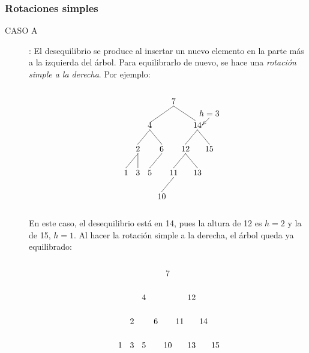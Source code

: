 \documentclass[10pt,a4paper,spanish]{report}
\begin{document}
\subsubsection{\textcolor[rgb]{0.3,0.4,0.8}Rotaciones simples}
\begin{description}
    \item[CASO A]: El desequilibrio se produce al insertar un nuevo elemento  en la parte más a la izquierda del árbol. Para equilibrarlo de nuevo, se hace una \textit{\textcolor[rgb]{0.3,0.4,0.8}{rotación simple a la derecha}}. Por ejemplo:

    \[\begin{xy}
	,(0,0)*+=<10mm>[]\txt<2cm>{7}
	,(15,-5)*+=<10mm>[]\txt<2cm>{$h=3$}
	,(-10,-10)*+=<10mm>[]\txt<2cm>{4}
	,(10,-10)*+=<10mm>[]\txt<2cm>{14}
	,(-15,-20)*+=<10mm>[]\txt<2cm>{2}
	,(-5,-20)*+=<10mm>[]\txt<2cm>{6}
	,(5,-20)*+=<10mm>[]\txt<2cm>{12}
	,(15,-20)*+=<10mm>[]\txt<2cm>{15}
	,(-20,-30)*+=<10mm>[]\txt<2cm>{1}
	,(-15,-30)*+=<10mm>[]\txt<2cm>{3}
	,(-10,-30)*+=<10mm>[]\txt<2cm>{5}
	,(0,-30)*+=<10mm>[]\txt<2cm>{11}
	,(10,-30)*+=<10mm>[]\txt<2cm>{13}
	,(-5,-40)*+=<10mm>[]\txt<2cm>{10}

	\ar@{->} (15,-7);(12,-10)
	\ar@{-} (0,-2);(-10,-9) %
	\ar@{-} (0,-2);(9,-8) %
	\ar@{-} (-10,-12);(-15,-18) %
	\ar@{-} (10,-12);(5,-18) %
	\ar@{-} (10,-12);(15,-18) %
	\ar@{-} (-15,-22);(-20,-28)
	\ar@{-} (-15,-22);(-15,-28)
	\ar@{-} (-10,-12);(-5,-18) %
	\ar@{-} (-5,-22);(-10,-28) %
	\ar@{-} (5,-22);(0,-28)
	\ar@{-} (5,-22);(10,-28)
	\ar@{-} (0,-32);(-5,-38) %
	\end{xy}\]

	\noindent
	En este caso, el desequilibrio está en 14, pues la altura de 12 es $h=2$ y la de 15, $h=1$. Al hacer la rotación simple a la derecha, el árbol queda ya equilibrado:

    \[\begin{xy}
	,(0,0)*+=<10mm>[]\txt<2cm>{7}
	,(-10,-10)*+=<10mm>[]\txt<2cm>{4}
	,(10,-10)*+=<10mm>[]\txt<2cm>{12}
	,(-15,-20)*+=<10mm>[]\txt<2cm>{2}
	,(-5,-20)*+=<10mm>[]\txt<2cm>{6}
	,(5,-20)*+=<10mm>[]\txt<2cm>{11}
	,(15,-20)*+=<10mm>[]\txt<2cm>{14}
	,(-20,-30)*+=<10mm>[]\txt<2cm>{1}
	,(-15,-30)*+=<10mm>[]\txt<2cm>{3}
	,(-10,-30)*+=<10mm>[]\txt<2cm>{5}
	,(0,-30)*+=<10mm>[]\txt<2cm>{10}
	,(10,-30)*+=<10mm>[]\txt<2cm>{13}
	,(20,-30)*+=<10mm>[]\txt<2cm>{15}


\end{xy}\]
\end{description}
\end{document}
